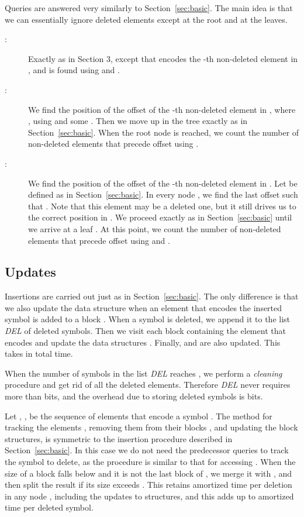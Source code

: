 \documentclass[11pt]{article}
\begin{document}
Queries are answered very similarly to 
Section~\ref{sec:basic}. The main idea is that we can essentially ignore
deleted elements except at the root and at the leaves.
\begin{description}
\item[:] 
Exactly as in Section 3, except that  encodes the -th 
non-deleted element in , and is found using  and .

\item[:] We find the position of the offset  of the 
-th non-deleted element in , where , using  and some . 
Then we move up in the tree exactly as in Section~\ref{sec:basic}.
When the root node  is reached, we count the number of non-deleted 
elements that precede offset  using . 

\item[:] We find the position of the offset  of the -th 
non-deleted element in . Let  be defined as in Section~\ref{sec:basic}. 
In every node , we find the last offset  such that
. Note that this element may be a deleted one, but it still drives us to
the correct position in . We proceed exactly as in 
Section~\ref{sec:basic} until we arrive at a leaf .
At this point, we count the number of non-deleted elements that precede 
offset  using  and .
\end{description}

\subsection{Updates} \label{sec:rankdel}

Insertions are carried out just as in Section~\ref{sec:basic}. 
The only difference is that we also update the data structure  when 
an element  that encodes the inserted symbol  is added to a block 
. When a symbol  is deleted, we append it to the list {\em DEL} of
deleted symbols. Then we visit each block  containing the element 
 that encodes  and update the data structures . 
Finally,  and  are also updated. This takes in total
 time.

When the number of symbols in the list {\em DEL} reaches
, we perform a \emph{cleaning} procedure 
and get rid of all the deleted elements. Therefore {\em DEL} never requires
more than  bits, and the overhead due to storing deleted symbols
is  bits.

Let , , be the sequence of elements that encode 
a symbol . The method for tracking the elements 
, removing them from their blocks , 
and updating the block structures, is symmetric to the insertion procedure 
described in Section~\ref{sec:basic}.  
In this case we do not need the predecessor
queries to track the symbol to delete, as the procedure is similar to that
for accessing . When the size of a block  falls below
 and it is not the last block of , we merge it with 
, and then split the result if its size exceeds .
This retains  amortized time per deletion in any node , 
including the updates to  structures, and this adds up to
 amortized time per deleted symbol.
\end{document}
